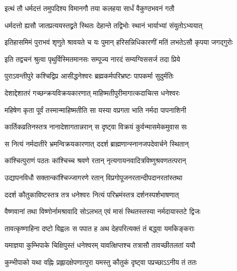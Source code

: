 \twolineshloka
{इत्थं तौ धर्मदत्तं तमुपदिश्य विमानगौ}
{तया कलहया सार्धं वैकुण्ठभवनं गतौ} %

\twolineshloka
{धर्मदत्तो ह्यसौ जातप्रत्ययस्तद्व्रते स्थितः}
{देहान्ते तद्विभोः स्थानं भार्याभ्यां संयुतोऽभ्ययात्} %

\twolineshloka
{इतिहासमिमं पुराभवं}
{शृणुते श्रावयते च यः पुमान्}
{हरिसन्निधिकारणीं मतिं}
{लभतेऽसौ कृपया जगद्गुरोः} %





\twolineshloka
{इति तद्वचनं श्रुत्वा पृथुर्विस्मितमानसः}
{सम्पूज्य नारदं सम्यग्विससर्ज तदा प्रिये} %

\twolineshloka
{पुराऽवन्तीपुरे कश्चिद्विप्र आसीद्धनेश्वरः}
{ब्रह्मकर्मपरिभ्रष्टः पापकर्मा सुदुर्मतिः} %

\twolineshloka
{देशाद्देशातरं गच्छन्क्रयविक्रयकारणात्}
{माहिष्मतीपुरीमागात्कदाचित्स धनेश्वरः} %

\twolineshloka
{महिषेण कृता पूर्वं तस्मान्माहिष्मतीति सा}
{यस्या वप्रगता भाति नर्मदा पापनाशिनी} %

\twolineshloka
{कार्तिकव्रतिनस्तत्र नानादेशागतान्नरान्}
{स दृष्ट्वा विक्रयं कुर्वन्मासमेकमुवास सः} %

\twolineshloka
{स नित्यं नर्मदातीरे भ्रमन्विक्रयकारणात्}
{ददर्श ब्राह्मणान्स्नानजपदेवार्चने स्थितान्} %

\twolineshloka
{कांश्चित्पुराणं पठतः कांश्चिच्च श्रवणे रतान्}
{नृत्यगायनवादित्रविष्णुश्रवणतत्परान्} %

\twolineshloka
{उद्यापनविधौ सक्तान्कांश्चिज्जागरणे रतान्}
{विप्रगोपूजनरतान्दीपदानरतांस्तथा} %

\twolineshloka
{ददर्श कौतुकाविष्टस्तत्र तत्र धनेश्वरः}
{नित्यं परिभ्रमंस्तत्र दर्शनस्पर्शभाषणात्} %

\twolineshloka
{वैष्णवानां तथा विष्णोर्नामश्रावादि सोऽलभत्}
{एवं मासं स्थितस्तस्या नर्मदायास्तटे द्विजः} %

\twolineshloka
{तावत्कृष्णाहिना दष्टो विह्वलः स पपात ह}
{अथ देहपरित्यक्तं तं बद्ध्वा यमकिङ्कराः} %

\twolineshloka
{यमाज्ञया कुम्भिपाके चिक्षिपुस्तं धनेश्वरम्}
{यावत्क्षिप्तश्च तत्रासौ तावच्छीतलतां ययौ} %

\twolineshloka
{कुम्भीपाको यथा वह्निः प्रह्लादक्षेपणात्पुरा}
{यमस्तु कौतुकं दृष्ट्वा पप्रच्छाऽऽनीय तं ततः} %



